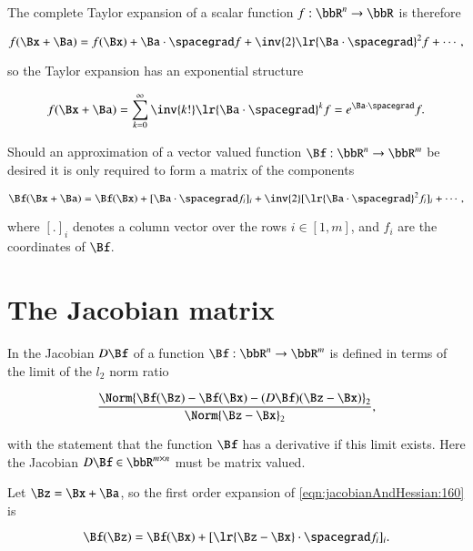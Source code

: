 The complete Taylor expansion of a scalar function \( f : \bbR^n \rightarrow \bbR \) is therefore

\begin{dmath}\label{eqn:jacobianAndHessian:120}
f(\Bx + \Ba)
= f(\Bx) +
\Ba \cdot \spacegrad f +
\inv{2} \lr{ \Ba \cdot \spacegrad}^2 f + \cdots,
\end{dmath}

so the Taylor expansion has an exponential structure

\begin{equation}\label{eqn:jacobianAndHessian:140}
f(\Bx + \Ba) = \sum_{k = 0}^\infty \inv{k!} \lr{ \Ba \cdot \spacegrad}^k f = e^{\Ba \cdot \spacegrad} f.
\end{equation}

Should an approximation of a vector valued function \( \Bf : \bbR^n \rightarrow \bbR^m \) be desired it is only required to form a matrix of the components

\begin{equation}\label{eqn:jacobianAndHessian:160}
\Bf(\Bx + \Ba)
= \Bf(\Bx) +
[\Ba \cdot \spacegrad f_i]_i +
\inv{2} [\lr{ \Ba \cdot \spacegrad}^2 f_i]_i + \cdots,
\end{equation}

where \( [.]_i \) denotes a column vector over the rows \( i \in [1,m] \), and \( f_i \) are the coordinates of \( \Bf \).

\section{The Jacobian matrix}

In \citep{boyd2004convex} the Jacobian \( D \Bf \) of a function \( \Bf : \bbR^n \rightarrow \bbR^m \) is defined in terms of the limit of the \( l_2 \) norm ratio

\begin{dmath}\label{eqn:jacobianAndHessian:180}
\frac{\Norm{\Bf(\Bz) - \Bf(\Bx) - (D \Bf) (\Bz - \Bx)}_2 }{ \Norm{\Bz - \Bx}_2 },
\end{dmath}

with the statement that the function \( \Bf \) has a derivative if this limit exists.  Here the Jacobian \( D \Bf \in \bbR^{m \times n} \) must be matrix valued.

Let \( \Bz = \Bx + \Ba \), so the first order expansion of \cref{eqn:jacobianAndHessian:160} is

\begin{dmath}\label{eqn:jacobianAndHessian:200}
\Bf(\Bz)
= \Bf(\Bx) + [\lr{ \Bz - \Bx } \cdot \spacegrad f_i]_i
.
\end{dmath}

